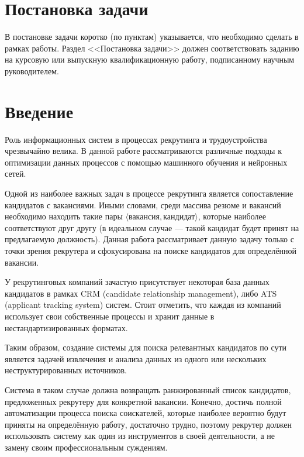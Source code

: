 \documentclass[14pt]{mmcs_article}
\begin{document}

\renewcommand{\contentsname}{Оглавление}

\tableofcontents

\newpage
{}

\section*{Постановка задачи}


В постановке задачи коротко (по пунктам) указывается, что необходимо сделать в рамках работы. Раздел <<Постановка задачи>> должен соответствовать заданию на курсовую или выпускную квалификационную работу, подписанному научным руководителем.

\newpage
{}
\section*{Введение}

Роль информационных систем в процессах рекрутинга и трудоустройства чрезвычайно велика.
В данной работе рассматриваются различные подходы к оптимизации данных процессов с помощью машинного обучения и нейронных сетей.

Одной из наиболее важных задач в процессе рекрутинга является сопоставление кандидатов с вакансиями. Иными словами, среди массива резюме и вакансий необходимо находить такие пары $\langle\text{вакансия},\text{кандидат}\rangle$, которые наиболее соответствуют друг другу (в идеальном случае --- такой кандидат будет принят на предлагаемую должность).
Данная работа рассматривает данную задачу только с точки зрения рекрутера и сфокусирована на поиске кандидатов для определённой вакансии.

У рекрутинговых компаний зачастую присутствует некоторая база данных кандидатов в рамках CRM (candidate relationship management), либо ATS (applicant tracking system) систем.
Стоит отметить, что каждая из компаний использует свои собственные процессы и хранит данные в нестандартизированных форматах.

Таким образом, создание системы для поиска релевантных кандидатов по сути является задачей извлечения и анализа данных из одного или нескольких неструктурированных источников.

Система в таком случае должна возвращать ранжированный список кандидатов, предложенных рекрутеру для конкретной вакансии. Конечно, достичь полной автоматизации процесса поиска соискателей, которые наиболее вероятно будут приняты на определённую работу, достаточно трудно, поэтому рекрутер должен использовать систему как один из инструментов в своей деятельности, а не замену своим профессиональным суждениям.
\end{document}
